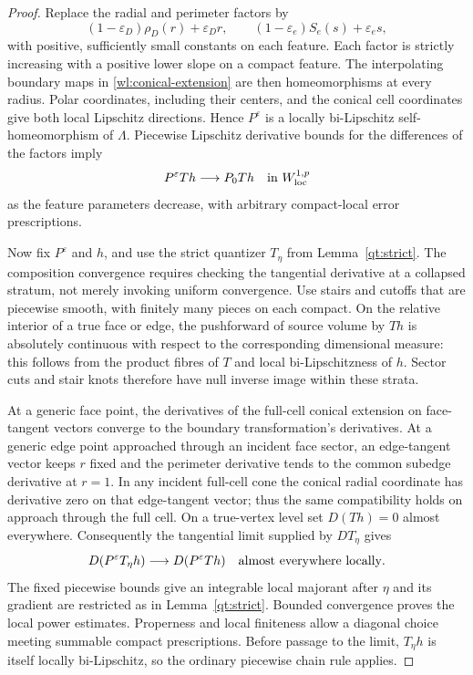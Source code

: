 \documentclass[11pt]{article}
\numberwithin{equation}{section}
\theoremstyle{definition}
\theoremstyle{remark}
\begin{document}
\begin{proof}
Replace the radial and perimeter factors by
\[
 (1-\varepsilon_D)\rho_D(r)+\varepsilon_Dr,
 \qquad (1-\varepsilon_e)S_e(s)+\varepsilon_es,
\]
with positive, sufficiently small constants on each feature.  Each
factor is strictly increasing with a positive lower slope on a
compact feature.  The interpolating boundary maps in
\eqref{wl:conical-extension} are then homeomorphisms at every radius.
Polar coordinates, including their centers, and the conical cell
coordinates give both local Lipschitz directions.  Hence
$P^{\varepsilon}$ is a locally bi-Lipschitz self-homeomorphism of
$\Lambda$.  Piecewise Lipschitz derivative bounds for the differences
of the factors imply
\[
 P^{\varepsilon}Th\longrightarrow P_0Th
       \quad\hbox{in }W^{1,p}_{\rm loc}
\]
as the feature parameters decrease, with arbitrary compact-local
error prescriptions.

Now fix $P^{\varepsilon}$ and $h$, and use the strict quantizer
$T_\eta$ from Lemma~\ref{qt:strict}.  The composition convergence
requires checking the tangential derivative at a collapsed stratum,
not merely invoking uniform convergence.  Use stairs and cutoffs
that are piecewise smooth, with finitely many pieces on each compact.
On the relative interior of a true face or edge, the pushforward of
source volume by $Th$ is absolutely continuous with respect to the
corresponding dimensional measure: this follows from the product
fibres of $T$ and local bi-Lipschitzness of $h$.  Sector cuts and stair
knots therefore have null inverse image within these strata.

At a generic face point, the derivatives of the full-cell conical
extension on face-tangent vectors converge to the boundary
transformation's derivatives.  At a generic edge point approached
through an incident face sector, an edge-tangent vector keeps $r$
fixed and the perimeter derivative tends to the common subedge
derivative at $r=1$.  In any incident full-cell cone the conical
radial coordinate has derivative zero on that edge-tangent vector;
thus the same compatibility holds on approach through the full
cell.  On a true-vertex level set $D(Th)=0$ almost everywhere.
Consequently the tangential limit supplied by $DT_\eta$ gives
\[
 D(P^{\varepsilon}T_\eta h)
      \longrightarrow D(P^{\varepsilon}Th)
       \quad\hbox{almost everywhere locally}.
\]
The fixed piecewise bounds give an integrable local majorant after
$\eta$ and its gradient are restricted as in
Lemma~\ref{qt:strict}.  Bounded convergence proves the local
power estimates.  Properness and local finiteness allow a diagonal
choice meeting summable compact prescriptions.  Before passage to
the limit, $T_\eta h$ is itself locally bi-Lipschitz, so the ordinary
piecewise chain rule applies.
\end{proof}
\end{document}

